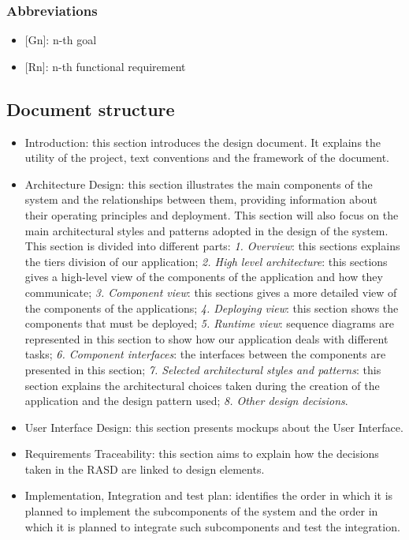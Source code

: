 \documentclass{article}
\begin{document}
\subsubsection{Abbreviations}
\begin{itemize}
\item {[Gn]: n-th goal}
\item {[Rn]: n-th functional requirement}
\end{itemize}
\subsection{Document structure}
\begin{itemize}
 \item Introduction: this section introduces the design document. It explains the utility of the project, text conventions and the framework of the document.
\item Architecture Design: this section illustrates the main components of the system and the relationships between them, providing information about their operating principles and deployment. This section will also focus on the main architectural styles and patterns adopted in the design of the system.\newline
This section is divided into different parts:\newline
\textit{1. Overview}: this sections explains the tiers division of our application;\newline
\textit{2. High level architecture}: this sections gives a high-level view of the components of the application and how they communicate;\newline
\textit{3. Component view}: this sections gives a more detailed view of the components of the applications;\newline
\textit{4. Deploying view}: this section shows the components that must be deployed;\newline
\textit{5. Runtime view}: sequence diagrams are represented in this section to show how our application deals with different tasks;\newline
\textit{6. Component interfaces}: the interfaces between the components are presented in this section;\newline
\textit{7. Selected architectural styles and patterns}: this section explains the architectural choices taken during the creation of the application and the design pattern used;\newline
\textit{8. Other design decisions}.
\item User Interface Design: this section presents mockups about the User Interface.
\item Requirements Traceability: this section aims to explain how the decisions taken in the RASD are linked to design elements.
\item Implementation, Integration and test plan: identifies the order in which it is planned to implement the subcomponents of the system and the order in which it is planned to integrate such subcomponents and test the integration.
\end{itemize}
\newpage
\end{document}

